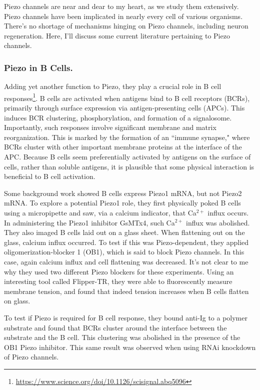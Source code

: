 Piezo channels are near and dear to my heart, as we study them extensively. Piezo channels have been implicated in nearly every cell of various organisms. There's no shortage of mechanisms hinging on Piezo channels, including neuron regeneration. Here, I'll discuss some current literature pertaining to Piezo channels. 


\subsubsection{Piezo in B Cells.}

Adding yet another function to Piezo, they play a crucial role in B cell responses\footnote{\url{https://www.science.org/doi/10.1126/scisignal.abq5096}}. B cells are activated when antigens bind to B cell receptors (BCRs), primarily through surface expression via antigen-presenting cells (APCs). This induces BCR clustering, phosphorylation, and formation of a signalosome. Importantly, such responses involve significant membrane and matrix reorganization. This is marked by the formation of an ``immune synapse," where BCRs cluster with other important membrane proteins at the interface of the APC. Because B cells seem preferentially activated by antigens on the surface of cells, rather than soluble antigens, it is plausible that some physical interaction is beneficial to B cell activation.\newline

Some background work showed B cells express Piezo1 mRNA, but not Piezo2 mRNA. To explore a potential Piezo1 role, they first physically poked B cells using a micropipette and saw, via a calcium indicator, that Ca$^{2+}$ influx occurs. In administering the Piezo1 inhibitor GsMTx4, such Ca$^{2+}$ influx was abolished. They also imaged B cells laid out on a glass sheet. When flattening out on the glass, calcium influx occurred. To test if this was Piezo-dependent, they applied oligomerization-blocker 1 (OB1), which is said to block Piezo channels. In this case, again calcium influx and cell flattening was decreased. It's not clear to me why they used two different Piezo blockers for these experiments. Using an interesting tool called Flipper-TR, they were able to fluorescently measure membrane tension, and found that indeed tension increases when B cells flatten on glass.\newline

To test if Piezo is required for B cell response, they bound anti-Ig to a polymer substrate and found that BCRs cluster around the interface between the substrate and the B cell. This clustering was abolished in the presence of the OB1 Piezo inhibitor. This same result was observed when using RNAi knockdown of Piezo channels. 


